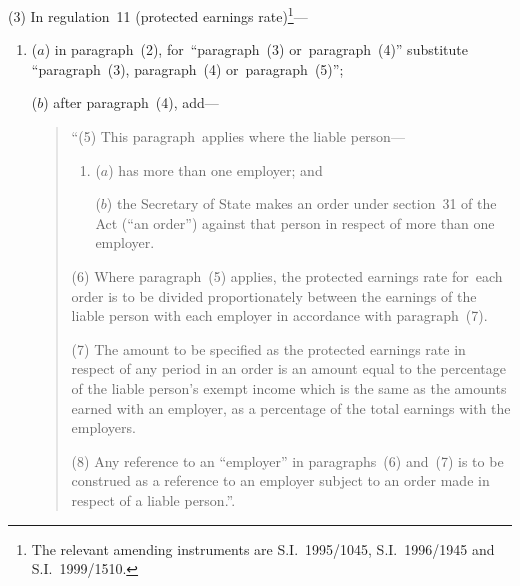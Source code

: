 \documentclass[12pt,a4paper]{article}
\begin{document}
(3) In regulation~11 (protected earnings rate)\footnote{The relevant amending instruments are S.I.~1995/1045, S.I.~1996/1945 and S.I.~1999/1510.}—
\begin{enumerate}\item[]
($a$) in paragraph~(2), for~“paragraph~(3) or~paragraph~(4)” substitute “paragraph~(3), paragraph~(4) or~paragraph~(5)”;

($b$) after paragraph~(4), add—
\begin{quotation}
“(5) This paragraph~applies where the liable person—
\begin{enumerate}\item[]
($a$) has more than one employer; and

($b$) the Secretary of State makes an order under section~31 of the Act (“an order”) against that person in respect of more than one employer.
\end{enumerate}

(6) Where paragraph~(5) applies, the protected earnings rate for~each order is to be divided proportionately between the earnings of the liable person with each employer in accordance with paragraph~(7).

(7) The amount to be specified as the protected earnings rate in respect of any period in an order is an amount equal to the percentage of the liable person’s exempt income which is the same as the amounts earned with an employer, as a percentage of the total earnings with the employers.

(8) Any reference to an “employer” in paragraphs~(6) and~(7) is to be construed as a reference to an employer subject to an order made in respect of a liable person.”.
\end{quotation}
\end{enumerate}
\end{document}
